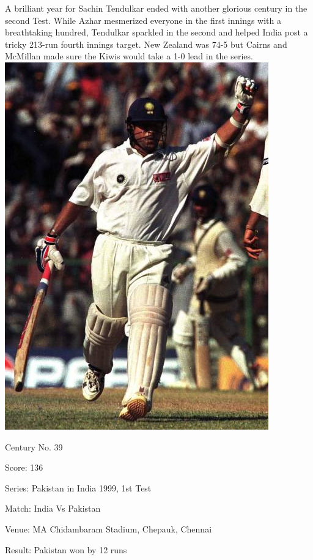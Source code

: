 \documentclass[11pt, a4paper]{article}
\begin{document}
A brilliant year for Sachin Tendulkar ended with another glorious century in the second Test. While Azhar mesmerized everyone in the first innings with a breathtaking hundred, Tendulkar sparkled in the second and helped India post a tricky 213-run fourth innings target. New Zealand was 74-5 but Cairns and McMillan made sure the Kiwis would take a 1-0 lead in the series.
\newpage
\includegraphics[height=0.75\textheight]{pics/39.jpg}

Century No. 39

Score: 136

Series: Pakistan in India 1999, 1st Test

Match: India Vs Pakistan

Venue: MA Chidambaram Stadium, Chepauk, Chennai

Result: Pakistan won by 12 runs
\end{document}
